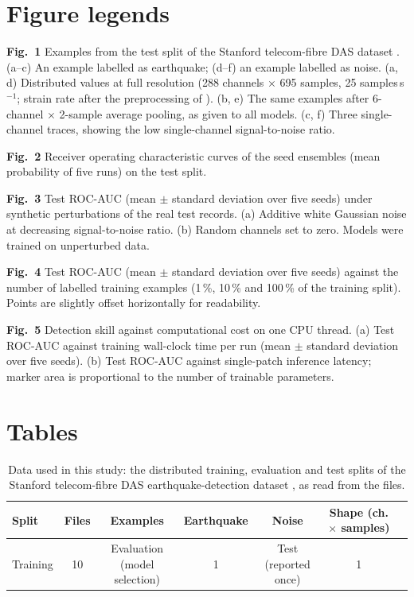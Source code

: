 \clearpage
\section*{Figure legends}
\noindent\textbf{Fig.~1} Examples from the test split of the Stanford telecom-fibre DAS dataset \citep{HuotData2022}. (a--c) An example labelled as earthquake; (d--f) an example labelled as noise. (a, d) Distributed values at full resolution (288 channels $\times$ 695 samples, 25 samples\,s$^{-1}$; strain rate after the preprocessing of \citet{HuotCode2022}). (b, e) The same examples after 6-channel $\times$ 2-sample average pooling, as given to all models. (c, f) Three single-channel traces, showing the low single-channel signal-to-noise ratio.

\noindent\textbf{Fig.~2} Receiver operating characteristic curves of the seed ensembles (mean probability of five runs) on the test split.

\noindent\textbf{Fig.~3} Test ROC-AUC (mean $\pm$ standard deviation over five seeds) under synthetic perturbations of the real test records. (a) Additive white Gaussian noise at decreasing signal-to-noise ratio. (b) Random channels set to zero. Models were trained on unperturbed data.

\noindent\textbf{Fig.~4} Test ROC-AUC (mean $\pm$ standard deviation over five seeds) against the number of labelled training examples (1\,\%, 10\,\% and 100\,\% of the training split). Points are slightly offset horizontally for readability.

\noindent\textbf{Fig.~5} Detection skill against computational cost on one CPU thread. (a) Test ROC-AUC against training wall-clock time per run (mean $\pm$ standard deviation over five seeds). (b) Test ROC-AUC against single-patch inference latency; marker area is proportional to the number of trainable parameters.

\clearpage
\section*{Tables}
\begin{table}[h]
\caption{Data used in this study: the distributed training, evaluation and test splits of the Stanford telecom-fibre DAS earthquake-detection dataset \citep{HuotData2022}, as read from the files.}\label{tab:data}
\centering\footnotesize\setlength{\tabcolsep}{3pt}
\begin{tabular}{lccccc}
\toprule
Split & Files & Examples & Earthquake & Noise & Shape (ch. $\times$ samples)\\
\midrule
Training & 10 & %
Evaluation (model selection) & 1 & %
Test (reported once) & 1 & %
\bottomrule
\end{tabular}
\end{table}

